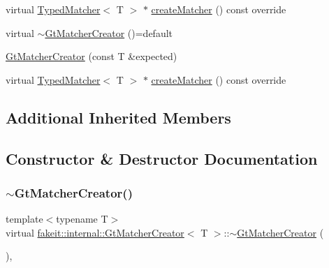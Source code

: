 \begin{DoxyCompactItemize}
virtual \mbox{\hyperlink{structfakeit_1_1TypedMatcher}{Typed\+Matcher}}$<$ T $>$ $\ast$ \mbox{\hyperlink{structfakeit_1_1internal_1_1GtMatcherCreator_ae7b905660b8aac92b70c783063c1ebdd}{create\+Matcher}} () const override
\item 
virtual \mbox{\hyperlink{structfakeit_1_1internal_1_1GtMatcherCreator_a8bd4c046db5b95b6da5470c9755b4484}{$\sim$\+Gt\+Matcher\+Creator}} ()=default
\item 
\mbox{\hyperlink{structfakeit_1_1internal_1_1GtMatcherCreator_ae89b4225c99c65c7fab77f93fea6c7c7}{Gt\+Matcher\+Creator}} (const T \&expected)
\item 
virtual \mbox{\hyperlink{structfakeit_1_1TypedMatcher}{Typed\+Matcher}}$<$ T $>$ $\ast$ \mbox{\hyperlink{structfakeit_1_1internal_1_1GtMatcherCreator_ae7b905660b8aac92b70c783063c1ebdd}{create\+Matcher}} () const override
\end{DoxyCompactItemize}
\subsection*{Additional Inherited Members}


\subsection{Constructor \& Destructor Documentation}
\mbox{\label{structfakeit_1_1internal_1_1GtMatcherCreator_a8bd4c046db5b95b6da5470c9755b4484}} 
\subsubsection{\texorpdfstring{$\sim$GtMatcherCreator()}{~GtMatcherCreator()}\hspace{0.1cm}{\footnotesize\ttfamily [1/9]}}
{\footnotesize\ttfamily template$<$typename T$>$ \\
virtual \mbox{\hyperlink{structfakeit_1_1internal_1_1GtMatcherCreator}{fakeit\+::internal\+::\+Gt\+Matcher\+Creator}}$<$ T $>$\+::$\sim$\mbox{\hyperlink{structfakeit_1_1internal_1_1GtMatcherCreator}{Gt\+Matcher\+Creator}} (\begin{DoxyParamCaption}{ }\end{DoxyParamCaption})\hspace{0.3cm}{\ttfamily [virtual]}, {\ttfamily [default]}}

